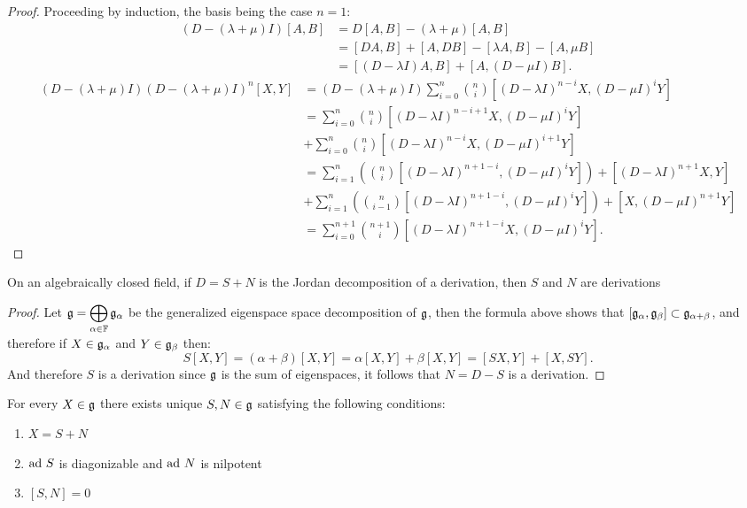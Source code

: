 \begin{proof}
	Proceeding by induction, the basis being the case $n=1$: 
	\begin{align*}
	(D-(\lambda+\mu)I)[A,B] &= D[A,B] - (\lambda + \mu)[A,B] \\ 
	&= [DA,B] + [A,DB] - [\lambda A,B] - [A,\mu B]\\
	&= [(D-\lambda I)A,B] + [A,(D-\mu I)B].
	\end{align*}
	\begin{align*}
	(D-(\lambda + \mu)I)
	(D-(\lambda+\mu)I)^n[X,Y] &= (D-(\lambda+\mu)I)\sum_{i=0}^n {n \choose i}[(D-\lambda I)^{n-i}X,(D-\mu I)^iY]\\
	&=\sum_{i=0}^n {n\choose i}[(D-\lambda I)^{n-i+1}X,(D-\mu I)^i Y]\\
	&+\sum_{i=0}^n {n \choose i}[(D-\lambda I)^{n-i}X,(D-\mu I)^{i+1}Y]\\
	&=\sum_{i=1}^{n} \left({n \choose {i}}[(D-\lambda I)^{n+1-i},(D-\mu I )^i Y]\right) + [(D-\lambda I)^{n+1}X,Y]\\
	&+\sum_{i=1}^{n}\left({n \choose i-1}[(D- \lambda I)^{n+1-i},(D-\mu I)^i Y] \right) + [X,(D- \mu I)^{n+1}Y]\\
	&= \sum_{i=0}^{n+1}{{n+1}\choose i}[(D-\lambda I)^{n+1-i}X,(D-\mu I)^i Y].
	\end{align*}
\end{proof}
\begin{corol}
	On an algebraically closed field, if $D=S+N$ is the Jordan decomposition of a derivation, then $S$ and $N$ are derivations
\end{corol}
\begin{proof}
	Let $\mathfrak{g} = \displaystyle\bigoplus_{\alpha \in \mathbb{F}} \mathfrak{g}_\alpha$ be the generalized eigenspace space decomposition of $\mathfrak{g}$, then the formula above shows that $[\mathfrak{g}_\alpha,\mathfrak{g}_\beta] \subset \mathfrak{g}_{\alpha+\beta}$, and therefore if $X \in \mathfrak{g}_\alpha$ and $Y \in \mathfrak{g}_\beta$ then:
	$$S[X,Y] = (\alpha+\beta)[X,Y] = \alpha[X,Y]+\beta[X,Y] = [SX,Y]+[X,SY].$$
	And therefore $S$ is a derivation since $\mathfrak{g}$ is the sum of eigenspaces, it follows that $N=D-S$ is a derivation.
\end{proof}
\begin{prop}
	For every $X \in \mathfrak{g}$ there exists unique $S,N \in \mathfrak{g}$ satisfying the following conditions:
	\begin{enumerate}[label=\alph*)]
		\item $X=S+N$
		\item $\text{ad}\  S$ is diagonizable and $\text{ad}\  N$ is nilpotent
		\item $[S,N]=0$
	\end{enumerate}
	\label{AbsJordanDecomp}
\end{prop}
